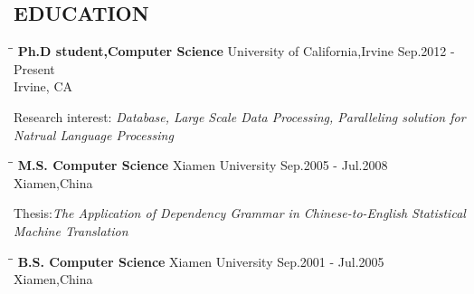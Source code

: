 \documentclass{res}
\begin{document}
\begin{resume}
\section{EDUCATION}          
   \vspace{-0.1in}	
   \begin{tabbing}
   \hspace{2.3in}\= \hspace{2.6in}\= \kill %
    {\bf Ph.D student,Computer Science} \>  University of California,Irvine \>Sep.2012 - Present\\
                             \>Irvine, CA
   \end{tabbing}\vspace{-20pt}      %
   Research interest:\emph{ Database, Large Scale Data Processing, Paralleling solution for Natrual Language Processing}
   \begin{tabbing}
   \hspace{2.3in}\= \hspace{2.6in}\= \kill %
    {\bf M.S. Computer Science} \>Xiamen University     \>Sep.2005 - Jul.2008\\
                             \>Xiamen,China
   \end{tabbing}\vspace{-20pt}      %
    Thesis:\emph{The Application of Dependency Grammar in Chinese-to-English Statistical Machine Translation}
   \begin{tabbing}
   \hspace{2.3in}\= \hspace{2.6in}\= \kill %
    {\bf B.S. Computer Science} \>Xiamen University     \>Sep.2001 - Jul.2005\\
                             \>Xiamen,China
   \end{tabbing}\vspace{-20pt}      %
 

\end{resume}
\end{document}
